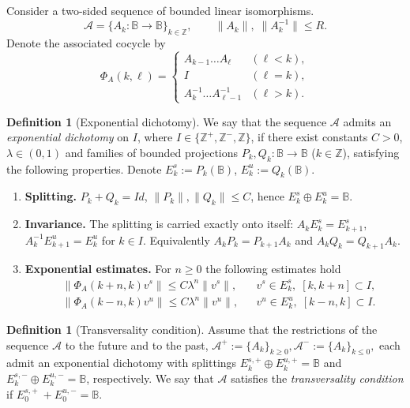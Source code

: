 \documentclass[12pt]{article}
\newcommand{\Bb}{\mathbb{B}}
\newcommand{\Zz}{\mathbb{Z}}
\theoremstyle{definition}
\newtheorem{defin}[thm]{Definition}
\begin{document}
Consider a two-sided sequence of bounded linear isomorphisms.
$$
\mathcal{A}=\{A_k: \Bb \to \Bb\}_{k\in\mathbb Z}, \qquad 
\|A_k\|,\;\|A_k^{-1}\|\le R.
$$
Denote the associated cocycle by
$$
\Phi_A(k,\ell)=\begin{cases}
 A_{k-1}\dots A_{\ell} & (\ell<k),\\[2pt]
 I & (\ell=k),\\[2pt]
 A_k^{-1}\dots A_{\ell-1}^{-1} & (\ell>k).
 \end{cases}
$$

\begin{defin}[Exponential dichotomy]\label{def:exp-dichotomy}
We say that the sequence $\mathcal{A}$ admits an \emph{exponential dichotomy} on $I$, where $I \in \{\Zz^+, \Zz^-, \Zz\}$, if there exist
constants $C>0$, $\lambda\in(0,1)$ and families of bounded projections
$P_k,Q_k:\Bb \to \Bb$ ($k\in\mathbb Z$), satisfying the following properties. Denote $E^s_k:=P_k(\Bb)$, $E^u_k:=Q_k(\Bb)$.
\begin{enumerate}
    \item[(ED1)] \textbf{Splitting.}  $P_k+Q_k=Id$, 
          $\|P_k\|,\|Q_k\|\le C$,  hence 
          $
          E^s_k\oplus E^u_k = \Bb
          $.
    \item[(ED2)] \textbf{Invariance.}  The splitting is carried exactly
          onto itself: $A_kE^s_k=E^s_{k+1}$, $A_k^{-1}E^u_{k+1}=E^u_{k}$ for $k\in I$.
          Equivalently $A_kP_k=P_{k+1}A_k$ and $A_kQ_k=Q_{k+1}A_k$.
    \item[(ED3)] \textbf{Exponential estimates.}  For $n \geq 0$ the following estimates hold   
          \begin{align*}
             &\|\Phi_A(k+n, k)  v^s\|\le C\lambda^n\|v^s\|,
               && v^s\in E^s_k, \; [k, k+n] \subset I, \\
             &\|\Phi_A(k-n, k) v^u\|\le C\lambda^n\|v^u\|,
               && v^u\in E^u_k, \; [k-n, k] \subset I .
          \end{align*}
\end{enumerate}
\end{defin}

\begin{defin}[Transversality condition]\label{def:transversality}
Assume that the restrictions of the sequence $\mathcal{A}$ to the future and to the past,
$
{\mathcal{A}}^{+}:=\{A_k\}_{k\ge 0}, {\mathcal{A}}^{-}:=\{A_k\}_{k\le 0},
$
each admit an exponential dichotomy with splittings
$E^{s,+}_k\oplus E^{u,+}_k=\Bb$ and
$E^{s,-}_k\oplus E^{u,-}_k=\Bb$, respectively.
We say that $\mathcal{A}$ satisfies the \emph{transversality condition} if
$
E^{s,+}_0\ + E^{u,-}_0 = \Bb.
$
\end{defin}
\end{document}
